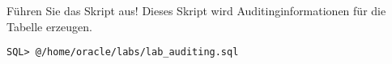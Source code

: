     \item F\"uhren Sie das Skript  aus! Dieses Skript wird Auditinginformationen f\"ur die Tabelle  erzeugen.
    \begin{lstlisting}[language=terminal]
SQL> @/home/oracle/labs/lab_auditing.sql
    \end{lstlisting}
